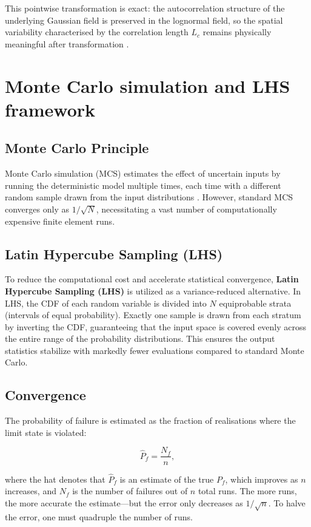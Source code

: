 This pointwise transformation is exact: the autocorrelation structure of the underlying Gaussian field is preserved in the lognormal field, so the spatial variability characterised by the correlation length $L_c$ remains physically meaningful after transformation \cite{delarrard2010}.

\section{Monte Carlo simulation and LHS framework} \label{sec:mc-lhs}
\subsection{Monte Carlo Principle}
Monte Carlo simulation (MCS) estimates the effect of uncertain inputs by running the deterministic model multiple times, each time with a different random sample drawn from the input distributions \cite{fenton2014}. However, standard MCS converges only as $1/\sqrt{N}$, necessitating a vast number of computationally expensive finite element runs.

\subsection{Latin Hypercube Sampling (LHS)} \label{sec:lhs-theory}
To reduce the computational cost and accelerate statistical convergence, \textbf{Latin Hypercube Sampling (LHS)} is utilized as a variance-reduced alternative. In LHS, the CDF of each random variable is divided into $N$ equiprobable strata (intervals of equal probability). Exactly one sample is drawn from each stratum by inverting the CDF, guaranteeing that the input space is covered evenly across the entire range of the probability distributions. This ensures the output statistics stabilize with markedly fewer evaluations compared to standard Monte Carlo.

\subsection{Convergence}

The probability of failure is estimated as the fraction of realisations where the limit state is violated:

\begin{equation}
    \hat{P}_f = \frac{N_f}{n},
    \label{eq:mc-pf}
\end{equation}

where the hat denotes that $\hat{P}_f$ is an estimate of the true $P_f$, which improves as $n$ increases, and $N_f$ is the number of failures out of $n$ total runs. The more runs, the more accurate the estimate---but the error only decreases as $1/\sqrt{n}$. To halve the error, one must quadruple the number of runs.


